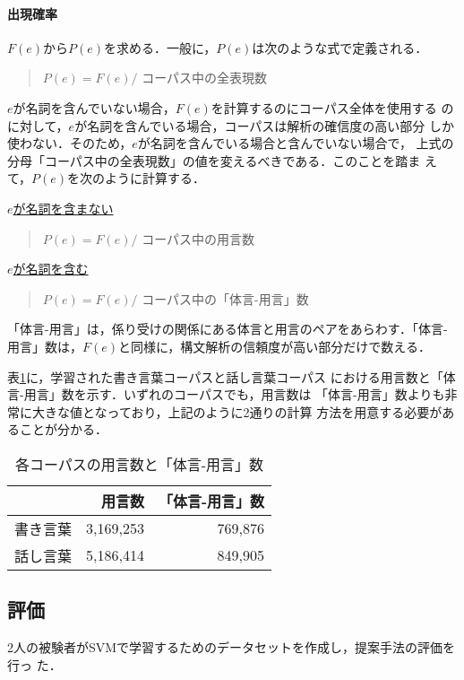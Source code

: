 \documentclass{nlp}
\begin{document}
\paragraph{出現確率}
$F(e)$から$P(e)$を求める．一般に，$P(e)$は次のような式で定義される．
\begin{quote}
 $P(e)=F(e)/$ コーパス中の全表現数
\end{quote}
$e$が名詞を含んでいない場合，$F(e)$を計算するのにコーパス全体を使用する
のに対して，$e$が名詞を含んでいる場合，コーパスは解析の確信度の高い部分
しか使わない．そのため，$e$が名詞を含んでいる場合と含んでいない場合で，
上式の分母「コーパス中の全表現数」の値を変えるべきである．このことを踏ま
えて，$P(e)$を次のように計算する．
\begin{flushleft}
 \underline{$e$が名詞を含まない}
 \begin{quote}
  $P(e)=F(e)/$ コーパス中の用言数
 \end{quote}
 \underline{$e$が名詞を含む}
 \begin{quote}
  $P(e)=F(e)/$ コーパス中の「体言-用言」数
 \end{quote}
\end{flushleft}
「体言-用言」は，係り受けの関係にある体言と用言のペアをあらわす．「体言-
用言」数は，$F(e)$と同様に，構文解析の信頼度が高い部分だけで数える．

表\ref{tab:verb_num}に，学習された書き言葉コーパスと話し言葉コーパス
における用言数と「体言-用言」数を示す．いずれのコーパスでも，用言数は
「体言-用言」数よりも非常に大きな値となっており，上記のように2通りの計算
方法を用意する必要があることが分かる．
\begin{table}[h]
 \caption{各コーパスの用言数と「体言-用言」数}
 \label{tab:verb_num}
 \begin{center}
  \begin{tabular}{crr}\hline
                &        用言数 & 「体言-用言」数  \\ \hline
     書き言葉 &     3,169,253 &      769,876 \\
     話し言葉 &     5,186,414 &      849,905 \\ \hline
  \end{tabular}
 \end{center}
\end{table}


\subsection{評価}
2人の被験者がSVMで学習するためのデータセットを作成し，提案手法の評価を行っ
た．
\end{document}
